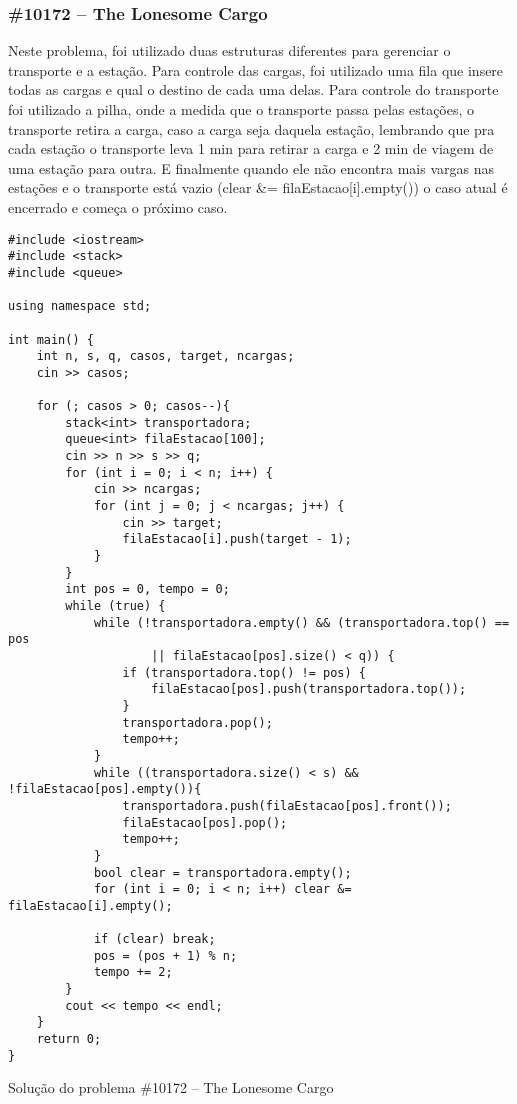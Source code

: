 \documentclass[a4paper,12pt]{scrartcl}
\begin{document}
\subsubsection{\#10172 – The Lonesome Cargo}
Neste problema, foi utilizado duas estruturas diferentes para gerenciar o transporte e a estação. Para controle das cargas, foi utilizado uma fila que insere todas as cargas e qual o destino de cada uma delas. Para controle do transporte foi utilizado a pilha, onde a medida que o transporte passa pelas estações, o transporte retira a carga, caso a carga seja daquela estação, lembrando que pra cada estação o transporte leva 1 min para retirar a carga e 2 min de viagem de uma estação para outra. E finalmente quando ele não encontra mais vargas nas estações e o transporte está vazio (clear &= filaEstacao[i].empty()) o caso atual é encerrado e começa o próximo caso.
\begin{listing}[H]
\begin{verbatim}
#include <iostream>
#include <stack>
#include <queue>

using namespace std;

int main() {
    int n, s, q, casos, target, ncargas;
    cin >> casos;
    
    for (; casos > 0; casos--){
        stack<int> transportadora;
        queue<int> filaEstacao[100];
        cin >> n >> s >> q;
        for (int i = 0; i < n; i++) {
            cin >> ncargas;
            for (int j = 0; j < ncargas; j++) {
                cin >> target;
                filaEstacao[i].push(target - 1);
            }
        }
        int pos = 0, tempo = 0;
        while (true) {
            while (!transportadora.empty() && (transportadora.top() == pos 
                    || filaEstacao[pos].size() < q)) {
                if (transportadora.top() != pos) {
                    filaEstacao[pos].push(transportadora.top());
                }
                transportadora.pop();
                tempo++;
            }
            while ((transportadora.size() < s) && !filaEstacao[pos].empty()){
                transportadora.push(filaEstacao[pos].front());
                filaEstacao[pos].pop();
                tempo++;
            }
            bool clear = transportadora.empty();
            for (int i = 0; i < n; i++) clear &= filaEstacao[i].empty();
            
            if (clear) break;
            pos = (pos + 1) % n;
            tempo += 2;
        }
        cout << tempo << endl;
    }
    return 0;
}
\end{verbatim}
\caption{\footnotesize{Solução do problema \#10172 – The Lonesome Cargo}}
\end{listing}
\end{document}
